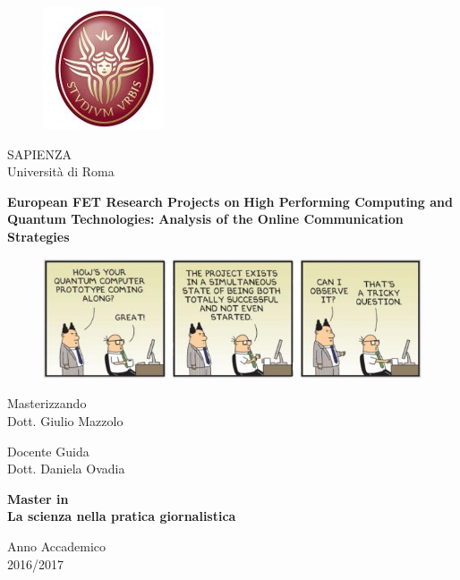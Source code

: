 \documentclass[12pt,a4paper,openright]{book}
\begin{document}
 
 
 \begin{figure}[!t] 
   \begin{center}
   \includegraphics[scale=0.3]{Images/Logo_sapienza.jpg}
   \end{center}
 \end{figure}  
 
 \begin{center}
   SAPIENZA \\
   Universit\`a di Roma \\
 \end{center}  

 \vspace{10mm}
   
 \begin{center}  
   \textbf{European FET Research Projects on}
   \textbf{High Performing Computing and Quantum Technologies:}
   \textbf{Analysis of the Online Communication Strategies}\\
 \end{center} 

 \vspace{5mm}
 
 \begin{figure}[h] 
   \begin{center}
   \includegraphics[scale=0.5]{Images/Front_image_no_credits.jpg}
   \end{center}
 \end{figure} 

 \begin{center}
   Masterizzando\\
   Dott. Giulio Mazzolo
 \end{center}

 \vspace{5mm}

 \begin{flushleft}
   Docente Guida\\ 
   Dott. Daniela Ovadia
 \end{flushleft}

 \vspace{5mm}

 \begin{center}
   \textbf{Master in} \\
   \textbf{La scienza nella pratica giornalistica}\\
   
   \vspace{5mm}
   
   Anno Accademico\\ 
   2016/2017 
 \end{center}
\end{document}
